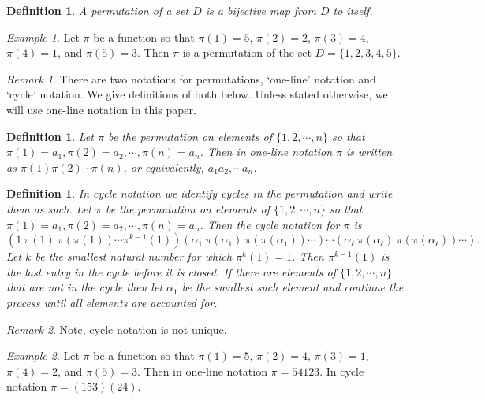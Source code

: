 \documentclass[11pt,letterpaper,twoside,english]{article}
\theoremstyle{theorem}
\newtheorem{definition}[theorem]{Definition}
\theoremstyle{remark}
\newtheorem{remark}{Remark}
\newtheorem{example}{Example}
\begin{document}
\begin{definition}
A permutation of a set $D$ is a bijective map from $D$ to itself. 
\end{definition}

\begin{example}
Let $\pi$ be a function so that $\pi(1)=5$, $\pi(2)=2$, $\pi(3)=4$, $\pi(4)=1$, and $\pi(5)=3$. Then $\pi$ is a permutation of the set $D=\{1,2,3,4,5\}$. 
\end{example}

\begin{remark}
There are two notations for permutations, `one-line' notation and `cycle' notation. We give definitions of both below. Unless stated otherwise, we will use one-line notation in this paper.
\end{remark}

\begin{definition}
Let $\pi$ be the permutation on elements of $\{1,2,\cdots, n\}$ so that $\pi(1)=a_1, \pi(2)=a_2,\cdots, \pi(n)=a_n$. Then in one-line notation $\pi$ is written as $\pi(1)\pi(2)\cdots\pi(n)$, or equivalently, $a_1a_2,\cdots a_n$. 
\end{definition}


\begin{definition}
In cycle notation we identify cycles in the permutation and write them as such. Let $\pi$ be the permutation on elements of $\{1,2,\cdots, n\}$ so that $\pi(1)=a_1, \pi(2)=a_2,\cdots, \pi(n)=a_n$. Then the cycle notation for $\pi$ is $$(1 \ \pi(1) \ \pi(\pi(1)) \cdots \pi^{k-1}(1))(\alpha_1 \ \pi(\alpha_1) \ \pi(\pi(\alpha_1)) \cdots)\cdots(\alpha_\ell \ \pi(\alpha_\ell) \ \pi(\pi(\alpha_\ell)) \cdots).$$ Let $k$ be the smallest natural number for which $\pi^k(1)=1$. Then $\pi^{k-1}(1)$ is the last entry in the cycle before it is closed. If there are elements of $\{1,2,\cdots, n\}$ that are not in the cycle then let $\alpha_1$ be the smallest such element and continue the process until all elements are accounted for. 
\end{definition}

\begin{remark}
Note, cycle notation is not unique. 
\end{remark}

\begin{example}
Let $\pi$ be a function so that $\pi(1)=5$, $\pi(2)=4$, $\pi(3)=1$, $\pi(4)=2$, and $\pi(5)=3$. Then in one-line notation $\pi=54123$. In cycle notation $\pi=(153)(24)$. 
\end{example}
\end{document}
